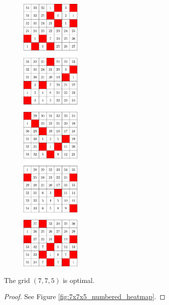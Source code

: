 \begin{figure}[H]
\centering
\includegraphics[width=0.26\textwidth]{figures/A/7x6x5_numbered_heatmap.pdf}
\caption{}
\label{fig:7x6x5_numbered_heatmap}
\end{figure}

\newpage

\begin{con}
\label{con:7x7x5}
The grid $(7,7,5)$ is optimal.
\end{con}

\begin{proof}
See Figure \ref{fig:7x7x5_numbered_heatmap}.
\end{proof}

